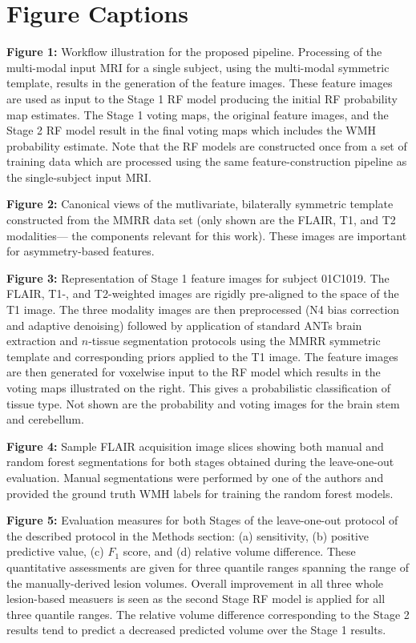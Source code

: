 \documentclass[12pt,]{article}
\title{}
\author{}
\date{}
\begin{document}
\maketitle

\section{Figure Captions}\label{figure-captions}

\textbf{Figure 1:} Workflow illustration for the proposed pipeline.
Processing of the multi-modal input MRI for a single subject, using the
multi-modal symmetric template, results in the generation of the feature
images. These feature images are used as input to the Stage 1 RF model
producing the initial RF probability map estimates. The Stage 1 voting
maps, the original feature images, and the Stage 2 RF model result in
the final voting maps which includes the WMH probability estimate. Note
that the RF models are constructed once from a set of training data
which are processed using the same feature-construction pipeline as the
single-subject input MRI.

\textbf{Figure 2:} Canonical views of the mutlivariate, bilaterally
symmetric template constructed from the MMRR data set (only shown are
the FLAIR, T1, and T2 modalities--- the components relevant for this
work). These images are important for asymmetry-based features.

\textbf{Figure 3:} Representation of Stage 1 feature images for subject
01C1019. The FLAIR, T1-, and T2-weighted images are rigidly pre-aligned
to the space of the T1 image. The three modality images are then
preprocessed (N4 bias correction and adaptive denoising) followed by
application of standard ANTs brain extraction and \(n\)-tissue
segmentation protocols using the MMRR symmetric template and
corresponding priors applied to the T1 image. The feature images are
then generated for voxelwise input to the RF model which results in the
voting maps illustrated on the right. This gives a probabilistic
classification of tissue type. Not shown are the probability and voting
images for the brain stem and cerebellum.

\textbf{Figure 4:} Sample FLAIR acquisition image slices showing both
manual and random forest segmentations for both stages obtained during
the leave-one-out evaluation. Manual segmentations were performed by one
of the authors and provided the ground truth WMH labels for training the
random forest models.

\textbf{Figure 5:} Evaluation measures for both Stages of the
leave-one-out protocol of the described protocol in the Methods section:
(a) sensitivity, (b) positive predictive value, (c) \(F_1\) score, and
(d) relative volume difference. These quantitative assessments are given
for three quantile ranges spanning the range of the manually-derived
lesion volumes. Overall improvement in all three whole lesion-based
measuers is seen as the second Stage RF model is applied for all three
quantile ranges. The relative volume difference corresponding to the
Stage 2 results tend to predict a decreased predicted volume over the
Stage 1 results.
\end{document}
